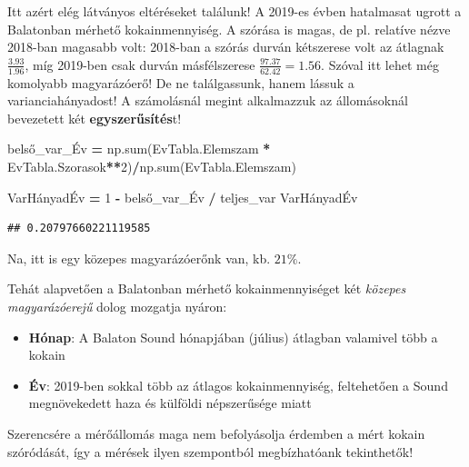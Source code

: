 \documentclass[
]{book}
\newenvironment{Shaded}{\begin{snugshade}}{\end{snugshade}}
\newcommand{\BuiltInTok}[1]{#1}
\newcommand{\DecValTok}[1]{\textcolor[rgb]{0.00,0.00,0.81}{#1}}
\newcommand{\NormalTok}[1]{#1}
\newcommand{\OperatorTok}[1]{\textcolor[rgb]{0.81,0.36,0.00}{\textbf{#1}}}
\providecommand{\tightlist}{%
  \setlength{\itemsep}{0pt}\setlength{\parskip}{0pt}}
\begin{document}
Itt azért elég látványos eltéréseket találunk! A 2019-es évben hatalmasat ugrott a Balatonban mérhető kokainmennyiség. A szórása is magas, de pl. relatíve nézve 2018-ban magasabb volt: 2018-ban a szórás durván kétszerese volt az átlagnak \(\frac{3.93}{1.96}\), míg 2019-ben csak durván másfélszerese \(\frac{97.37}{62.42}=1.56\). Szóval itt lehet még komolyabb magyarázóerő!
De ne találgassunk, hanem lássuk a varianciahányadost! A számolásnál megint alkalmazzuk az állomásoknál bevezetett két \textbf{egyszerűsítés}t!

\begin{Shaded}
\begin{Highlighting}[]
\NormalTok{belső\_var\_Év }\OperatorTok{=}\NormalTok{ np.}\BuiltInTok{sum}\NormalTok{(EvTabla.Elemszam }\OperatorTok{*}\NormalTok{ EvTabla.Szorasok}\OperatorTok{**}\DecValTok{2}\NormalTok{)}\OperatorTok{/}\NormalTok{np.}\BuiltInTok{sum}\NormalTok{(EvTabla.Elemszam)}

\NormalTok{VarHányadÉv }\OperatorTok{=} \DecValTok{1} \OperatorTok{{-}}\NormalTok{ belső\_var\_Év }\OperatorTok{/}\NormalTok{ teljes\_var}
\NormalTok{VarHányadÉv}
\end{Highlighting}
\end{Shaded}

\begin{verbatim}
## 0.20797660221119585
\end{verbatim}

Na, itt is egy közepes magyarázóerőnk van, kb. \(21\%\).

Tehát alapvetően a Balatonban mérhető kokainmennyiséget két \emph{közepes magyarázóerejű} dolog mozgatja nyáron:

\begin{itemize}
\tightlist
\item
  \textbf{Hónap}: A Balaton Sound hónapjában (július) átlagban valamivel több a kokain
\item
  \textbf{Év}: 2019-ben sokkal több az átlagos kokainmennyiség, feltehetően a Sound megnövekedett haza és külföldi népszerűsége miatt
\end{itemize}

Szerencsére a mérőállomás maga nem befolyásolja érdemben a mért kokain szóródását, így a mérések ilyen szempontból megbízhatóank tekinthetők!

  
\end{document}
